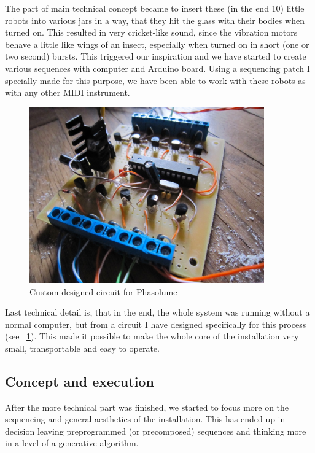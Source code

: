 \documentclass[12pt,a4paper,oneside]{report}
\begin{document}
The part of main technical concept became to insert these (in the end 10) little robots into various jars in a way, that they hit the glass with their bodies when turned on. This resulted in very cricket-like sound, since the vibration motors behave a little like wings of an insect, especially when turned on in short (one or two second) bursts. This triggered our inspiration and we have started to create various sequences with computer and Arduino board. Using a sequencing patch I specially made for this purpose, we have been able to work with these robots as with any other MIDI instrument.

\begin{figure}  
  \centering
    \includegraphics[width=0.9\textwidth]{img/phasolume}
	\caption{Custom designed circuit for Phasolume}
	\label{fig:phasolume}
\end{figure}

Last technical detail is, that in the end, the whole system was running without a normal computer, but from a circuit I have designed specifically for this process (see ~\ref{fig:phasolume}). This made it possible to make the whole core of the installation very small, transportable and easy to operate.

\subsection{Concept and execution} After the more technical part was finished, we started to focus more on the sequencing and general aesthetics of the installation. This has ended up in decision leaving preprogrammed (or precomposed) sequences and thinking more in a level of a generative algorithm. 
\end{document}
